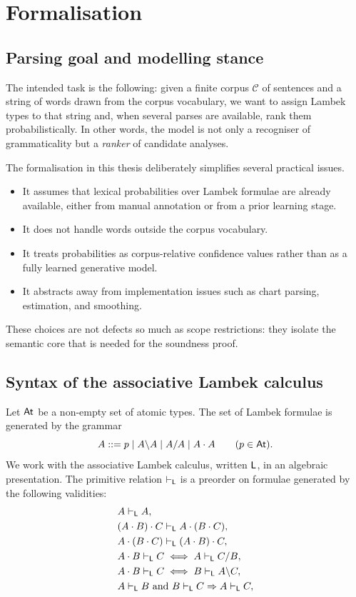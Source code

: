 \chapter{Formalisation}

\section{Parsing goal and modelling stance}
The intended task is the following: given a finite corpus $\mathcal C$ of sentences and a string of
words drawn from the corpus vocabulary, we want to assign Lambek types to that string and,
when several parses are available, rank them probabilistically. In other words, the model is not
only a recogniser of grammaticality but a \emph{ranker} of candidate analyses.

The formalisation in this thesis deliberately simplifies several practical issues.
\begin{itemize}
    \item It assumes that lexical probabilities over Lambek formulae are already available, either
    from manual annotation or from a prior learning stage.
    \item It does not handle words outside the corpus vocabulary.
    \item It treats probabilities as corpus-relative confidence values rather than as a fully learned
    generative model.
    \item It abstracts away from implementation issues such as chart parsing, estimation, and
    smoothing.
\end{itemize}
These choices are not defects so much as scope restrictions: they isolate the semantic core that
is needed for the soundness proof.


\section{Syntax of the associative Lambek calculus}
Let $\mathsf{At}$ be a non-empty set of atomic types. The set of Lambek formulae is generated by the
grammar
\[
A ::= p \mid A \backslash A \mid A / A \mid A \mathbin{\cdot} A
\qquad (p \in \mathsf{At}).
\]
We work with the associative Lambek calculus, written $\mathsf{L}$, in an algebraic presentation. The
primitive relation $\vdash_{\mathsf{L}}$ is a preorder on formulae generated by the following validities:
\begin{align*}
& A \vdash_{\mathsf{L}} A, \\
& (A \mathbin{\cdot} B) \mathbin{\cdot} C \vdash_{\mathsf{L}} A \mathbin{\cdot} (B \mathbin{\cdot} C), \\
& A \mathbin{\cdot} (B \mathbin{\cdot} C) \vdash_{\mathsf{L}} (A \mathbin{\cdot} B) \mathbin{\cdot} C, \\
& A \mathbin{\cdot} B \vdash_{\mathsf{L}} C \iff A \vdash_{\mathsf{L}} C/B, \\
& A \mathbin{\cdot} B \vdash_{\mathsf{L}} C \iff B \vdash_{\mathsf{L}} A\backslash C, \\
& A \vdash_{\mathsf{L}} B \text{ and } B \vdash_{\mathsf{L}} C \Rightarrow A \vdash_{\mathsf{L}} C,
\end{align*}

